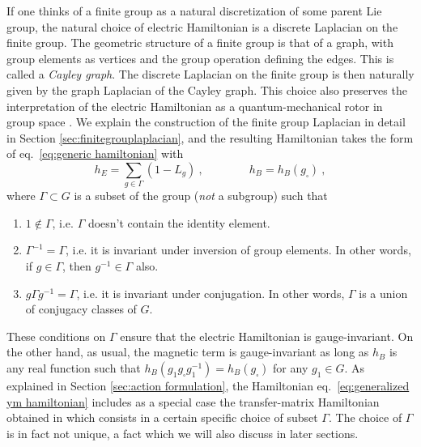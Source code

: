 If one thinks of a finite group as a natural discretization of some parent Lie group, the natural choice of electric Hamiltonian is a discrete Laplacian on the finite group.
The geometric structure of a finite group is that of a graph, with group elements as vertices and the group operation defining the edges.
This is called a \textit{Cayley graph}.
The discrete Laplacian on the finite group is then naturally given by the graph Laplacian of the Cayley graph.
This choice also preserves the interpretation of the electric Hamiltonian as a quantum-mechanical rotor in group space \cite{KogSuss}.
We explain the construction of the finite group Laplacian in detail in Section \ref{sec:finitegrouplaplacian}, and the resulting Hamiltonian takes the form of eq.~\eqref{eq:generic hamiltonian} with
\begin{equation}
    \label{eq:generalized ym hamiltonian}
    h_E = \sum_{g \in \Gamma} (1-L_g)  \ , \quad \quad \quad \quad h_B= h_B (g_\square) \ ,
\end{equation}
where $\Gamma \subset G$ is a subset of the group (\textit{not} a subgroup) such that
\begin{enumerate}
    \item $1 \not \in \Gamma$, i.e. $\Gamma$ doesn't contain the identity element.
    \item $\Gamma^{-1}=\Gamma$, i.e. it is invariant under inversion of group elements.
In other words, if $g \in \Gamma$, then $g^{-1} \in \Gamma$ also.
    \item $g \Gamma g^{-1} = \Gamma$, i.e. it is invariant under conjugation.
In other words, $\Gamma$ is a union of conjugacy classes of $G$.
\end{enumerate}
These conditions on $\Gamma$ ensure that the electric Hamiltonian is gauge-invariant.
On the other hand, as usual, the magnetic term is gauge-invariant as long as $h_B$ is any real function such that $h_B(g_1 g_\square g_1^{-1})=h_B(g_\square)$ for any $g_1 \in G$.
As explained in Section \ref{sec:action formulation}, the Hamiltonian eq.~\eqref{eq:generalized ym hamiltonian} includes as a special case the transfer-matrix Hamiltonian obtained in \cite{TransferMatrixFiniteGroup} which consists in a certain specific choice of subset $\Gamma$.
The choice of $\Gamma$ is in fact not unique, a fact which we will also discuss in later sections.

